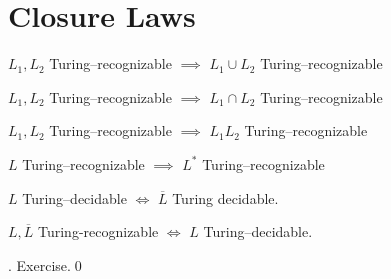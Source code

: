 \section{Closure Laws}

\begin{thm}
\begin{tightlist}
\item $L_1, L_2$ Turing--recognizable $\implies$
      $L_1 \cup L_2$ Turing--recognizable
\item $L_1, L_2$ Turing--recognizable $\implies$
      $L_1 \cap L_2$ Turing--recognizable
\item $L_1, L_2$ Turing--recognizable $\implies$
      $L_1 L_2$ Turing--recognizable
\item $L$ Turing--recognizable $\implies$
      $L^*$ Turing--recognizable
\item $L$ Turing--decidable $\iff$
      $\overline L$ Turing decidable. 
\item $L, \overline L$ Turing-recognizable
      $\iff$
      $L$ Turing--decidable.
\end{tightlist}
\end{thm}


\proof. Exercise.\qed
